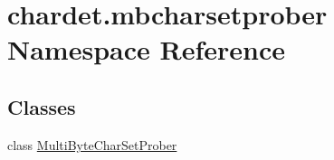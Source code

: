 \hypertarget{namespacechardet_1_1mbcharsetprober}{}\section{chardet.\+mbcharsetprober Namespace Reference}
\label{namespacechardet_1_1mbcharsetprober}
\subsection*{Classes}
\begin{DoxyCompactItemize}
\item 
class \hyperlink{classchardet_1_1mbcharsetprober_1_1_multi_byte_char_set_prober}{Multi\+Byte\+Char\+Set\+Prober}
\end{DoxyCompactItemize}
